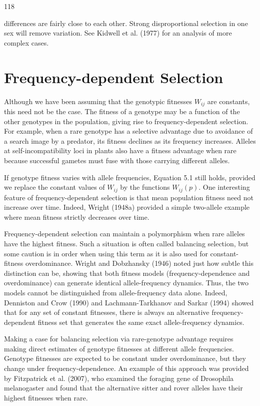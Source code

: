 \documentclass{article}
\begin{document}
118

differences are fairly close to each other. Strong disproportional selection in one sex will remove variation. See Kidwell et al. (1977) for an analysis of more complex cases.

\section{Frequency-dependent Selection}
Although we have been assuming that the genotypic fitnesses  $ W_{ij} $ are constants, this need not be the case. The fitness of a genotype may be a function of the other genotypes in the population, giving rise to frequency-dependent selection. For example, when a rare genotype has a selective advantage due to avoidance of a search image by a predator, its fitness declines as its frequency increases. Alleles at self-incompatibility loci in plants also have a fitness advantage when rare because successful gametes must fuse with those carrying different alleles.

If genotype fitness varies with allele frequencies, Equation 5.1 still holds, provided we replace the constant values of  $ W_{ij} $ by the functions  $ W_{ij}(p) $. One interesting feature of frequency-dependent selection is that mean population fitness need not increase over time. Indeed, Wright (1948a) provided a simple two-allele example where mean fitness strictly decreases over time.

Frequency-dependent selection can maintain a polymorphism when rare alleles have the highest fitness. Such a situation is often called balancing selection, but some caution is in order when using this term as it is also used for constant-fitness overdominance. Wright and Dobzhansky (1946) noted just how subtle this distinction can be, showing that both fitness models (frequency-dependence and overdominance) can generate identical allele-frequency dynamics. Thus, the two models cannot be distinguished from allele-frequency data alone. Indeed, Denniston and Crow (1990) and Lachmann-Tarkhanov and Sarkar (1994) showed that for any set of constant fitnesses, there is always an alternative frequency-dependent fitness set that generates the same exact allele-frequency dynamics.

Making a case for balancing selection via rare-genotype advantage requires making direct estimates of genotype fitnesses at different allele frequencies. Genotype fitnesses are expected to be constant under overdominance, but they change under frequency-dependence. An example of this approach was provided by Fitzpatrick et al. (2007), who examined the foraging gene of Drosophila melanogaster and found that the alternative sitter and rover alleles have their highest fitnesses when rare.
\end{document}
